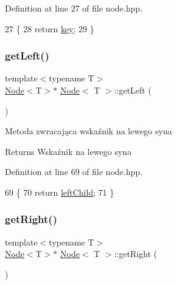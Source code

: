 Definition at line 27 of file node.\+hpp.


\begin{DoxyCode}
27                    \{
28             \textcolor{keywordflow}{return} \hyperlink{classNode_a9d5e5c1914f5ed67389740354a607527}{key};
29         \}
\end{DoxyCode}
\mbox{\label{classNode_a1c884e62ef0a9b5dd4f35dbea09145f2}} 
\subsubsection{\texorpdfstring{get\+Left()}{getLeft()}}
{\footnotesize\ttfamily template$<$typename T$>$ \\
\hyperlink{classNode}{Node}$<$T$>$$\ast$ \hyperlink{classNode}{Node}$<$ T $>$\+::get\+Left (\begin{DoxyParamCaption}{ }\end{DoxyParamCaption})\hspace{0.3cm}{\ttfamily [inline]}}

Metoda zwracająca wskaźnik na lewego syna \begin{DoxyReturn}{Returns}
Wskaźnik na lewego syna 
\end{DoxyReturn}


Definition at line 69 of file node.\+hpp.


\begin{DoxyCode}
69                            \{
70              \textcolor{keywordflow}{return} \hyperlink{classNode_a2eaaeffaeef97da6291b788fa131c9ec}{leftChild};
71         \}
\end{DoxyCode}
\mbox{\label{classNode_af9078f2651b16fc1a3502d7927761df1}} 
\subsubsection{\texorpdfstring{get\+Right()}{getRight()}}
{\footnotesize\ttfamily template$<$typename T$>$ \\
\hyperlink{classNode}{Node}$<$T$>$$\ast$ \hyperlink{classNode}{Node}$<$ T $>$\+::get\+Right (\begin{DoxyParamCaption}{ }\end{DoxyParamCaption})\hspace{0.3cm}{\ttfamily [inline]}}

